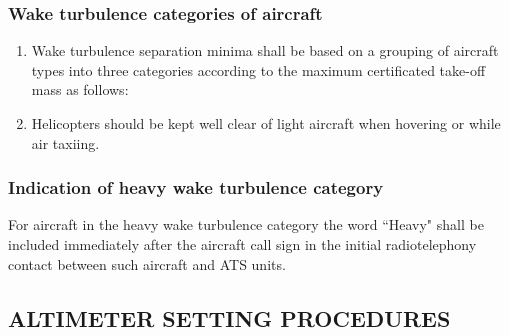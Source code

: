 \documentclass[../main.tex]{subfiles}
\begin{document}
    \subsubsection{Wake turbulence categories of aircraft}

    \begin{enumerate}
        \item Wake turbulence separation minima shall be based on a grouping of aircraft types into three categories according to the maximum certificated take-off mass as follows:


        \item Helicopters should be kept well clear of light aircraft when hovering or while air taxiing.


    \end{enumerate}

    \subsubsection{Indication of heavy wake turbulence category}

    For aircraft in the heavy wake turbulence category the word ``Heavy" shall be included immediately after the aircraft call sign in the initial radiotelephony contact between such aircraft and ATS units.


    \subsection[Altimeter setting procedures]{ALTIMETER SETTING PROCEDURES}
\end{document}
